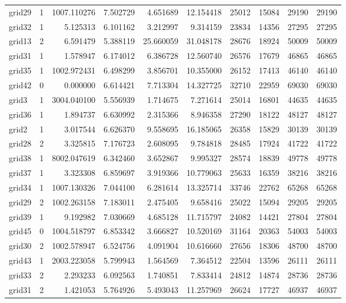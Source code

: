 \begin{longtable}{|l|r|r|r|r|r|r|r|r|r|}
grid29 & 1 & 1007.110276 & 7.502729 & 4.651689 & 12.154418 & 25012 & 15084 & 29190 & 29190 \\
grid32 & 1 & 5.125313 & 6.101162 & 3.212997 & 9.314159 & 23834 & 14356 & 27295 & 27295 \\
grid13 & 2 & 6.591479 & 5.388119 & 25.660059 & 31.048178 & 28676 & 18924 & 50009 & 50009 \\
grid31 & 1 & 1.578947 & 6.174012 & 6.386728 & 12.560740 & 26576 & 17679 & 46865 & 46865 \\
grid35 & 1 & 1002.972431 & 6.498299 & 3.856701 & 10.355000 & 26152 & 17413 & 46140 & 46140 \\
grid42 & 0 & 0.000000 & 6.614421 & 7.713304 & 14.327725 & 32710 & 22959 & 69030 & 69030 \\
grid3 & 1 & 3004.040100 & 5.556939 & 1.714675 & 7.271614 & 25014 & 16801 & 44635 & 44635 \\
grid36 & 1 & 1.894737 & 6.630992 & 2.315366 & 8.946358 & 27290 & 18122 & 48127 & 48127 \\
grid2 & 1 & 3.017544 & 6.626370 & 9.558695 & 16.185065 & 26358 & 15829 & 30139 & 30139 \\
grid28 & 2 & 3.325815 & 7.176723 & 2.608095 & 9.784818 & 28485 & 17924 & 41722 & 41722 \\
grid38 & 1 & 8002.047619 & 6.342460 & 3.652867 & 9.995327 & 28574 & 18839 & 49778 & 49778 \\
grid37 & 1 & 3.323308 & 6.859697 & 3.919366 & 10.779063 & 25633 & 16359 & 38216 & 38216 \\
grid34 & 1 & 1007.130326 & 7.044100 & 6.281614 & 13.325714 & 33746 & 22762 & 65268 & 65268 \\
grid29 & 2 & 1002.263158 & 7.183011 & 2.475405 & 9.658416 & 25022 & 15094 & 29205 & 29205 \\
grid39 & 1 & 9.192982 & 7.030669 & 4.685128 & 11.715797 & 24082 & 14421 & 27804 & 27804 \\
grid45 & 0 & 1004.518797 & 6.853342 & 3.666827 & 10.520169 & 31164 & 20363 & 54003 & 54003 \\
grid30 & 2 & 1002.578947 & 6.524756 & 4.091904 & 10.616660 & 27656 & 18306 & 48700 & 48700 \\
grid43 & 1 & 2003.223058 & 5.799943 & 1.564569 & 7.364512 & 22504 & 13596 & 26111 & 26111 \\
grid33 & 2 & 2.293233 & 6.092563 & 1.740851 & 7.833414 & 24812 & 14874 & 28736 & 28736 \\
grid31 & 2 & 1.421053 & 5.764926 & 5.493043 & 11.257969 & 26624 & 17727 & 46937 & 46937 \\

\end{longtable}
